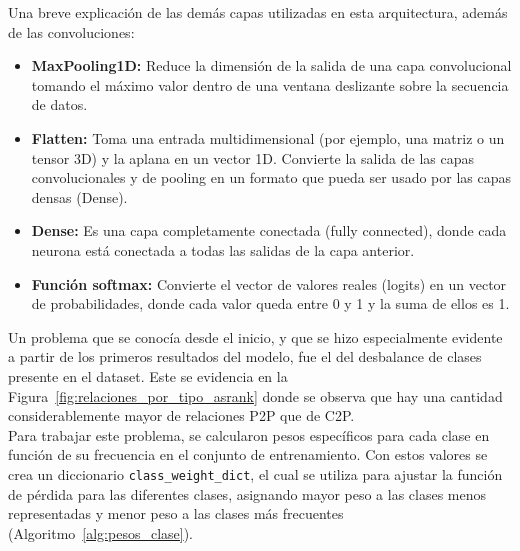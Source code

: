 Una breve explicación de las demás capas utilizadas en esta arquitectura, además de las convoluciones:\\

\begin{itemize}

    \item \textbf{MaxPooling1D:} Reduce la dimensión de la salida de una capa convolucional tomando el máximo valor dentro de una ventana deslizante sobre la secuencia de datos.

    \item \textbf{Flatten:} Toma una entrada multidimensional (por ejemplo, una matriz o un tensor 3D) y la aplana en un vector 1D. Convierte la salida de las capas convolucionales y de pooling en un formato que pueda ser usado por las capas densas (Dense).

    \item \textbf{Dense:} Es una capa completamente conectada (fully connected), donde cada neurona está conectada a todas las salidas de la capa anterior.

    \item \textbf{Función softmax:} Convierte el vector de valores reales (logits) en un vector de probabilidades, donde cada valor queda entre 0 y 1 y la suma de ellos es 1.\\

\end{itemize}

Un problema que se conocía desde el inicio, y que se hizo especialmente evidente a partir de los primeros resultados del modelo, fue el del desbalance de clases presente en el dataset. Este se evidencia en la Figura~\ref{fig:relaciones_por_tipo_asrank} donde se observa que hay una cantidad considerablemente mayor de relaciones P2P que de C2P.\\


Para trabajar este problema, se calcularon pesos específicos para cada clase en función de su frecuencia en el conjunto de entrenamiento. Con estos valores se crea un diccionario \texttt{class\_weight\_dict}, el cual se utiliza para ajustar la función de pérdida para las diferentes clases, asignando mayor peso a las clases menos representadas y menor peso a las clases más frecuentes (Algoritmo~\ref{alg:pesos_clase}).\\

